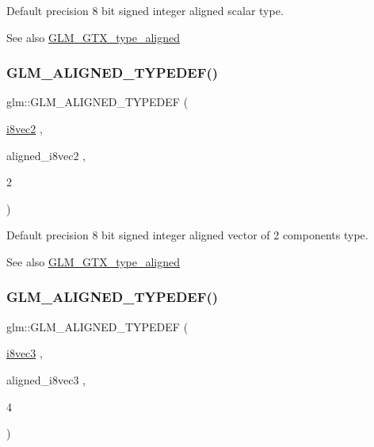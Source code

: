 Default precision 8 bit signed integer aligned scalar type. \begin{DoxySeeAlso}{See also}
\mbox{\hyperlink{group__gtx__type__aligned}{G\+L\+M\+\_\+\+G\+T\+X\+\_\+type\+\_\+aligned}} 
\end{DoxySeeAlso}
\mbox{\label{group__gtx__type__aligned_ga25b3fe1d9e8d0a5e86c1949c1acd8131}} 
\subsubsection{\texorpdfstring{GLM\_ALIGNED\_TYPEDEF()}{GLM\_ALIGNED\_TYPEDEF()}\hspace{0.1cm}{\footnotesize\ttfamily [54/209]}}
{\footnotesize\ttfamily glm\+::\+G\+L\+M\+\_\+\+A\+L\+I\+G\+N\+E\+D\+\_\+\+T\+Y\+P\+E\+D\+EF (\begin{DoxyParamCaption}\item[{\mbox{\hyperlink{group__gtc__type__precision_ga277312370b6155b37dbf2a6954c42915}{i8vec2}}}]{,  }\item[{aligned\+\_\+i8vec2}]{,  }\item[{2}]{ }\end{DoxyParamCaption})}

Default precision 8 bit signed integer aligned vector of 2 components type. \begin{DoxySeeAlso}{See also}
\mbox{\hyperlink{group__gtx__type__aligned}{G\+L\+M\+\_\+\+G\+T\+X\+\_\+type\+\_\+aligned}} 
\end{DoxySeeAlso}
\mbox{\label{group__gtx__type__aligned_ga2958f907719d94d8109b562540c910e2}} 
\subsubsection{\texorpdfstring{GLM\_ALIGNED\_TYPEDEF()}{GLM\_ALIGNED\_TYPEDEF()}\hspace{0.1cm}{\footnotesize\ttfamily [55/209]}}
{\footnotesize\ttfamily glm\+::\+G\+L\+M\+\_\+\+A\+L\+I\+G\+N\+E\+D\+\_\+\+T\+Y\+P\+E\+D\+EF (\begin{DoxyParamCaption}\item[{\mbox{\hyperlink{group__gtc__type__precision_ga97a6cae79db311cdd47c4e88a5855987}{i8vec3}}}]{,  }\item[{aligned\+\_\+i8vec3}]{,  }\item[{4}]{ }\end{DoxyParamCaption})}

